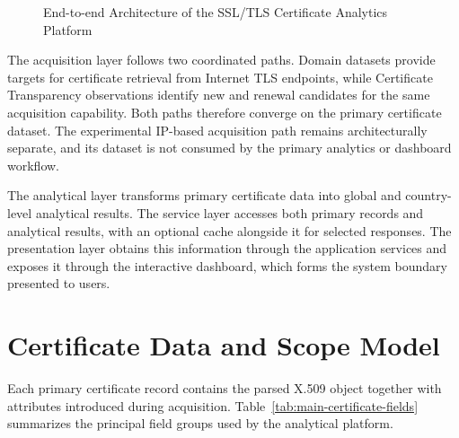 \begin{figure}[H]
  \caption{End-to-end Architecture of the SSL/TLS Certificate Analytics Platform}
  \label{fig:overall-architecture}
\end{figure}

The acquisition layer follows two coordinated paths. Domain datasets provide
targets for certificate retrieval from Internet TLS endpoints, while
Certificate Transparency observations identify new and renewal candidates for
the same acquisition capability. Both paths therefore converge on the primary
certificate dataset. The experimental IP-based acquisition path remains
architecturally separate, and its dataset is not consumed by the primary
analytics or dashboard workflow.

The analytical layer transforms primary certificate data into global and
country-level analytical results. The service layer accesses both primary
records and analytical results, with an optional cache alongside it for selected
responses. The presentation layer obtains this information through the
application services and exposes it through the interactive dashboard, which
forms the system boundary presented to users.

\section{Certificate Data and Scope Model}
\label{sec:mongodb-data-model}

Each primary certificate record contains the parsed X.509 object together with
attributes introduced during acquisition. Table~\ref{tab:main-certificate-fields}
summarizes the principal field groups used by the analytical platform.

